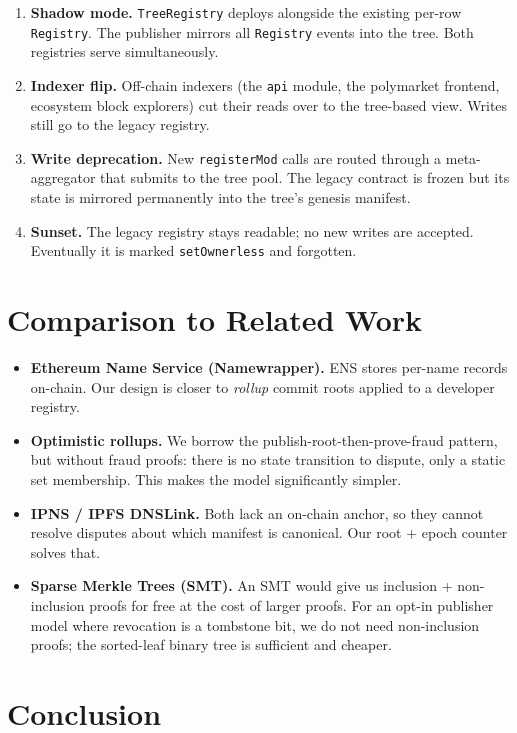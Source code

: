 \documentclass[11pt,a4paper]{article}
\begin{document}
\begin{enumerate}
    \item \textbf{Shadow mode.} \texttt{TreeRegistry} deploys alongside the existing per-row \texttt{Registry}. The publisher mirrors all \texttt{Registry} events into the tree. Both registries serve simultaneously.
    \item \textbf{Indexer flip.} Off-chain indexers (the \texttt{api} module, the polymarket frontend, ecosystem block explorers) cut their reads over to the tree-based view. Writes still go to the legacy registry.
    \item \textbf{Write deprecation.} New \texttt{registerMod} calls are routed through a meta-aggregator that submits to the tree pool. The legacy contract is frozen but its state is mirrored permanently into the tree's genesis manifest.
    \item \textbf{Sunset.} The legacy registry stays readable; no new writes are accepted. Eventually it is marked \texttt{setOwnerless} and forgotten.
\end{enumerate}

\section{Comparison to Related Work}

\begin{itemize}
    \item \textbf{Ethereum Name Service (Namewrapper).} ENS stores per-name records on-chain. Our design is closer to \emph{rollup} commit roots applied to a developer registry.
    \item \textbf{Optimistic rollups.} We borrow the publish-root-then-prove-fraud pattern, but without fraud proofs: there is no state transition to dispute, only a static set membership. This makes the model significantly simpler.
    \item \textbf{IPNS / IPFS DNSLink.} Both lack an on-chain anchor, so they cannot resolve disputes about which manifest is canonical. Our root + epoch counter solves that.
    \item \textbf{Sparse Merkle Trees (SMT).} An SMT would give us inclusion + non-inclusion proofs for free at the cost of larger proofs. For an opt-in publisher model where revocation is a tombstone bit, we do not need non-inclusion proofs; the sorted-leaf binary tree is sufficient and cheaper.
\end{itemize}

\section{Conclusion}
\end{document}
